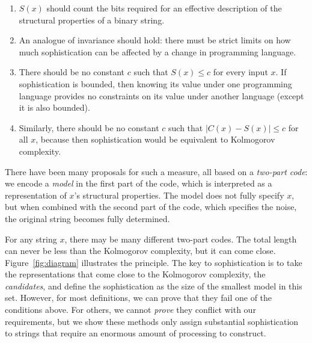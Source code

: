 \begin{enumerate}
\item $S(x)$ should count the bits required for an effective description of the structural properties of a binary string.
\item An analogue of invariance should hold: there must be strict limits on how much sophistication can be affected by a change in programming language.
\item There should be no constant $c$ such that $S(x)\le c$ for every input $x$. If sophistication is bounded, then knowing its value under one programming language provides no constraints on its value under another language (except it is also bounded). 
\item Similarly, there should be no constant $c$ such that $\left | C(x)-S(x)\right |\le c$ for all $x$, because then sophistication would be equivalent to Kolmogorov complexity. 
\end{enumerate}
There have been many proposals for such a measure, all based on a \emph{two-part code}: we encode a \emph{model} in the first part of the code, which is interpreted as a representation of $x$'s structural properties. The model does not fully specify $x$, but when combined with the second part of the code, which specifies the noise, the original string becomes fully determined.\footnotemark


For any string $x$, there may be many different two-part codes. The total length can never be less than the Kolmogorov complexity, but it can come close. Figure~\ref{fig:diagram} illustrates the principle. The key to sophistication is to take the representations that come close to the Kolmogorov complexity, the \emph{candidates}, and define the sophistication as the size of the smallest model in this set. However, for most definitions, we can prove that they fail one of the conditions above. For others, we cannot \emph{prove} they conflict with our requirements, but we show these methods only assign substantial sophistication to strings that require an enormous amount of processing to construct. 

